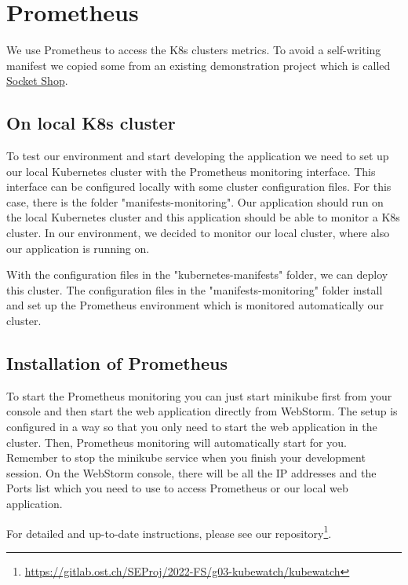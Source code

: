 \chapter{Prometheus}
We use Prometheus to access the K8s clusters metrics. To avoid a self-writing manifest we copied some from an existing demonstration project which is called \href{https://github.com/microservices-demo/microservices-demo}{Socket Shop}.

\section{On local K8s cluster}
To test our environment and start developing the application we need to set up our local Kubernetes cluster with the Prometheus monitoring interface. This interface can be configured locally with some cluster configuration files. For this case, there is the folder "manifests-monitoring". Our application should run on the local Kubernetes cluster and this application should be able to monitor a K8s cluster. In our environment, we decided to monitor our local cluster, where also our application is running on.

With the configuration files in the "kubernetes-manifests" folder, we can deploy this cluster. The configuration files in the "manifests-monitoring" folder install and set up the Prometheus environment which is monitored automatically our cluster.

\section{Installation of Prometheus}
To start the Prometheus monitoring you can just start minikube first from your console and then start the web application directly from WebStorm. The setup is configured in a way so that you only need to start the web application in the cluster. Then, Prometheus monitoring will automatically start for you. Remember to stop the minikube service when you finish your development session. On the WebStorm console, there will be all the IP addresses and the Ports list which you need to use to access Prometheus or our local web application.

For detailed and up-to-date instructions, please see our repository\footnote{\url{https://gitlab.ost.ch/SEProj/2022-FS/g03-kubewatch/kubewatch}}.


